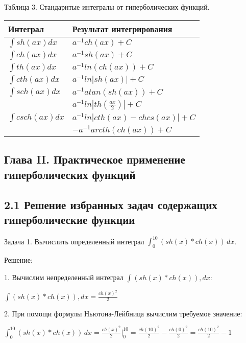 \documentclass{article}
\begin{document}
Таблица 3. Стандарнтые интегралы от гиперболических функций.
\begin{center}
    \begin{tabular}{| p{5cm} | p{7cm} |}
        \hline
        Интеграл & Результат интегрирования\\ \hline
       $\int sh(ax) dx$ & $a^{-1}ch(ax)+C$\\ \hline
       $\int ch(ax) dx$ & $a^{-1}sh(ax)+C$\\ \hline
       $\int th(ax) dx$ & $a^{-1}ln(ch(ax))+C$\\ \hline
       $\int cth(ax) dx$ & $a^{-1}ln|sh(ax)|+C$\\ \hline
       $\int sch(ax) dx$ & $a^{-1}atan(sh(ax))+C$\\ \hline
        & $a^{-1}ln|th(\frac{ax}{2})|+C$\\ 
       $\int csch(ax) dx$ & $a^{-1}ln|cth(ax)-chcs(ax)|+C$\\ 
        & $-a^{-1}arcth(ch(ax))+C$\\ \hline
    \end{tabular}
\end{center}

\subsection*{Глава II. Практическое применение гиперболических функций}
\subsection*{2.1 Решение избранных задач содержащих гиперболические функции}
Задача 1. Вычислить определенный интеграл $\int_{0}^{10} (sh(x)*ch(x)) \,dx$.

Решение:

1. Вычислим непределенный интеграл $\int (sh(x)*ch(x)), dx$:\\
\begin{center}
    $\int (sh(x)*ch(x)), dx = \frac{ch(x)^2}{2}$
\end{center}

2. При помощи формулы Ньютона-Лейбница вычислим требуемое значение:\\
\begin{center}
    $\int_{0}^{10} (sh(x)*ch(x)) \,dx = \frac{ch(x)^2}{2}\vert_0^{10} = \frac{ch(10)^2}{2} - \frac{ch(0)^2}{2} = \frac{ch(10)^2}{2} - 1$
\end{center}
\end{document}
